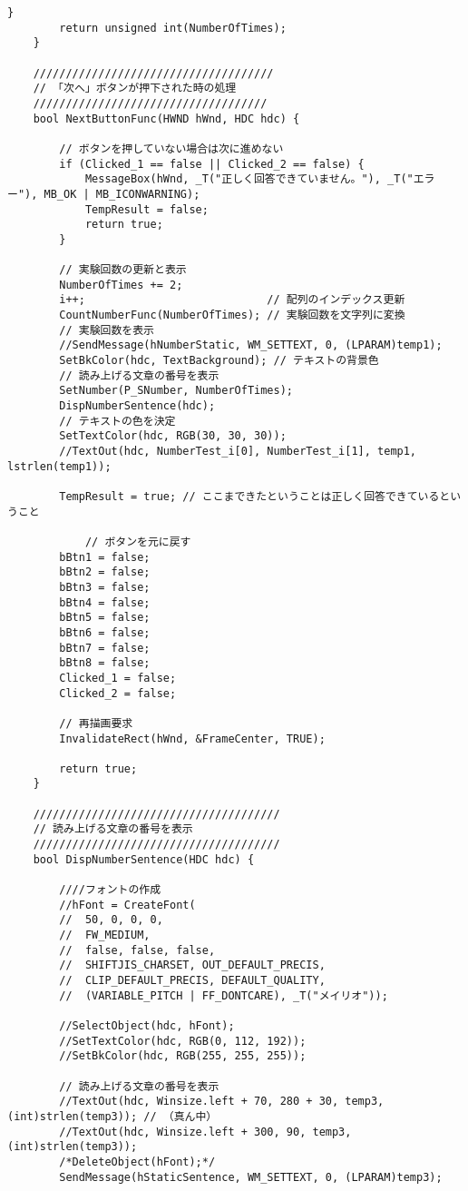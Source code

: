 \begin{lstlisting}[caption=main.cpp]
		}
		return unsigned int(NumberOfTimes);
	}
	
	/////////////////////////////////////
	// 「次へ」ボタンが押下された時の処理
	////////////////////////////////////
	bool NextButtonFunc(HWND hWnd, HDC hdc) {
	
		// ボタンを押していない場合は次に進めない
		if (Clicked_1 == false || Clicked_2 == false) {
			MessageBox(hWnd, _T("正しく回答できていません。"), _T("エラー"), MB_OK | MB_ICONWARNING);
			TempResult = false;
			return true;
		}
	
		// 実験回数の更新と表示
		NumberOfTimes += 2;
		i++;                            // 配列のインデックス更新
		CountNumberFunc(NumberOfTimes); // 実験回数を文字列に変換
		// 実験回数を表示
		//SendMessage(hNumberStatic, WM_SETTEXT, 0, (LPARAM)temp1);
		SetBkColor(hdc, TextBackground); // テキストの背景色
		// 読み上げる文章の番号を表示
		SetNumber(P_SNumber, NumberOfTimes);
		DispNumberSentence(hdc);
		// テキストの色を決定
		SetTextColor(hdc, RGB(30, 30, 30));
		//TextOut(hdc, NumberTest_i[0], NumberTest_i[1], temp1, lstrlen(temp1));
		
		TempResult = true; // ここまできたということは正しく回答できているということ
	
			// ボタンを元に戻す
		bBtn1 = false;
		bBtn2 = false;
		bBtn3 = false;
		bBtn4 = false;
		bBtn5 = false;
		bBtn6 = false;
		bBtn7 = false;
		bBtn8 = false;
		Clicked_1 = false;
		Clicked_2 = false;
	
		// 再描画要求
		InvalidateRect(hWnd, &FrameCenter, TRUE);
	
		return true;
	}
	
	//////////////////////////////////////
	// 読み上げる文章の番号を表示
	//////////////////////////////////////
	bool DispNumberSentence(HDC hdc) {
	
		////フォントの作成
		//hFont = CreateFont(
		//	50, 0, 0, 0,
		//	FW_MEDIUM,
		//	false, false, false,
		//	SHIFTJIS_CHARSET, OUT_DEFAULT_PRECIS,
		//	CLIP_DEFAULT_PRECIS, DEFAULT_QUALITY,
		//	(VARIABLE_PITCH | FF_DONTCARE), _T("メイリオ"));
	
		//SelectObject(hdc, hFont);
		//SetTextColor(hdc, RGB(0, 112, 192));
		//SetBkColor(hdc, RGB(255, 255, 255));
		
		// 読み上げる文章の番号を表示
		//TextOut(hdc, Winsize.left + 70, 280 + 30, temp3, (int)strlen(temp3)); // （真ん中）
		//TextOut(hdc, Winsize.left + 300, 90, temp3, (int)strlen(temp3));
		/*DeleteObject(hFont);*/
		SendMessage(hStaticSentence, WM_SETTEXT, 0, (LPARAM)temp3);
	

\end{lstlisting}
